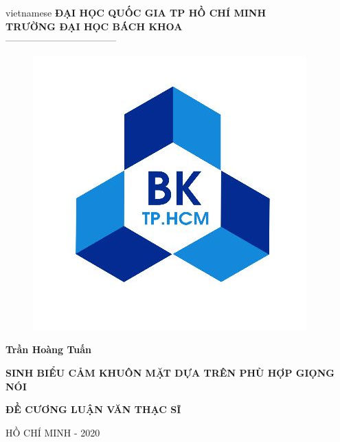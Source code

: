 \begin{titlepage}
\begin{center}

\vspace*{3\bigskipamount}

\begin{otherlanguage*}{vietnamese}
\makeatletter
\fontsize{12}{12}\textbf{ĐẠI HỌC QUỐC GIA TP HỒ CHÍ MINH}\\
\fontsize{14}{14}\textbf{TRƯỜNG ĐẠI HỌC BÁCH KHOA}\\
\fontsize{14}{14} -----------------------------------
\makeatother

\begin{figure}[h]
	\centering
		\includegraphics[width=0.4\columnwidth]{./title/bach_khoa.jpeg}
		\centering
	\label{fig:logo}
\end{figure}

{\makeatletter
\fontsize{16}{16}\textbf{Trần Hoàng Tuấn}\\
\makeatother}

\vspace{1.2cm}

{\makeatletter
\fontsize{18}{18}\textbf{SINH BIỂU CẢM KHUÔN MẶT DỰA TRÊN PHÙ HỢP GIỌNG NÓI}\\
\makeatother}

\vspace{1.2cm}
{\makeatletter
\fontsize{18}{18}\textbf{ĐỀ CƯƠNG LUẬN VĂN THẠC SĨ}\\
\makeatother}


\vspace{8cm}
{\makeatletter
\fontsize{12}{12} HỒ CHÍ MINH - 2020\\
\makeatother}

\end{otherlanguage*}

\end{center}
\end{titlepage}

